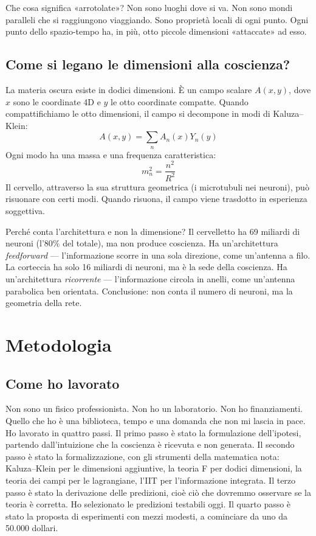Che cosa significa «arrotolate»? Non sono luoghi dove si va. Non sono mondi paralleli che si raggiungono viaggiando. Sono proprietà locali di ogni punto. Ogni punto dello spazio-tempo ha, in più, otto piccole dimensioni «attaccate» ad esso.

\subsection{Come si legano le dimensioni alla coscienza?}
La materia oscura esiste in dodici dimensioni. È un campo scalare $A(x,y)$, dove $x$ sono le coordinate 4D e $y$ le otto coordinate compatte. Quando compattifichiamo le otto dimensioni, il campo si decompone in modi di Kaluza--Klein:
\begin{equation}
A(x,y) = \sum_n A_n(x) Y_n(y)
\end{equation}
Ogni modo ha una massa e una frequenza caratteristica:
\begin{equation}
m_n^2 = \frac{n^2}{R^2}
\end{equation}
Il cervello, attraverso la sua struttura geometrica (i microtubuli nei neuroni), può risuonare con certi modi. Quando risuona, il campo viene trasdotto in esperienza soggettiva.

Perché conta l'architettura e non la dimensione? Il cervelletto ha 69 miliardi di neuroni (l'80\% del totale), ma non produce coscienza. Ha un'architettura \textit{feedforward} --- l'informazione scorre in una sola direzione, come un'antenna a filo. La corteccia ha solo 16 miliardi di neuroni, ma è la sede della coscienza. Ha un'architettura \textit{ricorrente} --- l'informazione circola in anelli, come un'antenna parabolica ben orientata. Conclusione: non conta il numero di neuroni, ma la geometria della rete.

\section{Metodologia}
\subsection{Come ho lavorato}
Non sono un fisico professionista. Non ho un laboratorio. Non ho finanziamenti. Quello che ho è una biblioteca, tempo e una domanda che non mi lascia in pace. Ho lavorato in quattro passi. Il primo passo è stato la formulazione dell'ipotesi, partendo dall'intuizione che la coscienza è ricevuta e non generata. Il secondo passo è stato la formalizzazione, con gli strumenti della matematica nota: Kaluza--Klein per le dimensioni aggiuntive, la teoria F per dodici dimensioni, la teoria dei campi per le lagrangiane, l'IIT per l'informazione integrata. Il terzo passo è stato la derivazione delle predizioni, cioè ciò che dovremmo osservare se la teoria è corretta. Ho selezionato le predizioni testabili oggi. Il quarto passo è stato la proposta di esperimenti con mezzi modesti, a cominciare da uno da 50.000 dollari.

